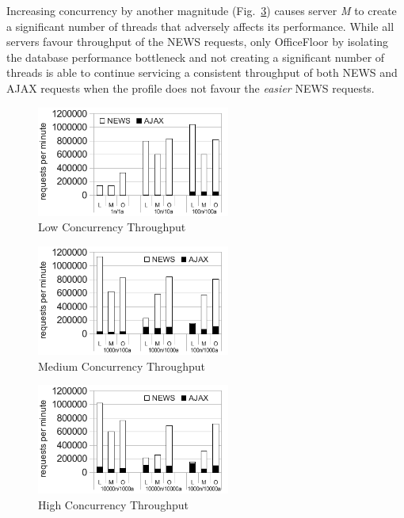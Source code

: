 \documentclass[conference]{ieee/IEEEtran}
\begin{document}
Increasing concurrency by another magnitude
(Fig.~\ref{fig:high_concurrency_throughput}) causes server \textit{M} to create
a significant number of threads that adversely affects its performance.
While all servers favour throughput of the NEWS requests, only OfficeFloor by
isolating the database performance bottleneck and not creating a significant
number of threads is able to continue servicing a consistent throughput of both
NEWS and AJAX requests when the profile does not favour the \textit{easier} NEWS
requests.

\begin{figure}[!t]
\centering 
\includegraphics[width=2.5in]{LowConcurrencyThroughput}
\caption{Low Concurrency Throughput}
\label{fig:low_concurrency_throughput}
\end{figure}


\begin{figure}[!t]
\centering 
\includegraphics[width=2.5in]{MediumConcurrencyThroughput}
\caption{Medium Concurrency Throughput}
\label{fig:medium_concurrency_throughput}
\end{figure}

\begin{figure}[!t]
\centering 
\includegraphics[width=2.5in]{HighConcurrencyThroughput}
\caption{High Concurrency Throughput}
\label{fig:high_concurrency_throughput}
\end{figure}
  
\end{document}
